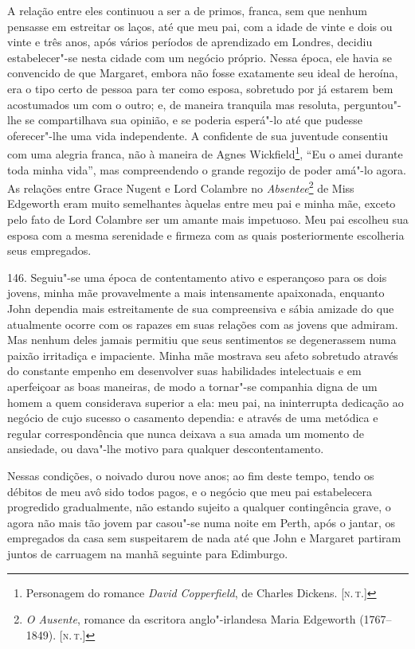 A relação entre eles continuou a ser a de primos, franca, sem que nenhum
pensasse em estreitar os laços, até que meu pai, com a idade de vinte e
dois ou vinte e três anos, após vários períodos de aprendizado em
Londres, decidiu estabelecer"-se nesta cidade com um negócio próprio.
Nessa época, ele havia se convencido de que Margaret, embora não fosse
exatamente seu ideal de heroína, era o tipo certo de pessoa para ter
como esposa, sobretudo por já estarem bem acostumados um com o outro; e,
de maneira tranquila mas resoluta, perguntou"-lhe se compartilhava sua
opinião, e se poderia esperá"-lo até que pudesse oferecer"-lhe uma vida
independente. A confidente de sua juventude consentiu com uma alegria
franca, não à maneira de Agnes Wickfield\footnote{Personagem do romance
  \emph{David Copperfield}, de Charles Dickens. {[}\textsc{n.\,t.}{]}}, ``Eu o
amei durante toda minha vida'', mas compreendendo o grande regozijo de
poder amá"-lo agora. As relações entre Grace Nugent e Lord Colambre no
\emph{Absentee}\footnote{\emph{O Ausente}, romance da escritora
  anglo"-irlandesa Maria Edgeworth (1767--1849). {[}\textsc{n.\,t.}{]}} de Miss
Edgeworth eram muito semelhantes àquelas entre meu pai e minha mãe,
exceto pelo fato de Lord Colambre ser um amante mais impetuoso. Meu pai
escolheu sua esposa com a mesma serenidade e firmeza com as quais
posteriormente escolheria seus empregados.

146. Seguiu"-se uma época de contentamento ativo e esperançoso para os
dois jovens, minha mãe provavelmente a mais intensamente apaixonada,
enquanto John dependia mais estreitamente de sua compreensiva e sábia
amizade do que atualmente ocorre com os rapazes em suas relações com as
jovens que admiram. Mas nenhum deles jamais permitiu que seus
sentimentos se degenerassem numa paixão irritadiça e impaciente. Minha
mãe mostrava seu afeto sobretudo através do constante empenho em
desenvolver suas habilidades intelectuais e em aperfeiçoar as boas
maneiras, de modo a tornar"-se companhia digna de um homem a quem
considerava superior a ela: meu pai, na ininterrupta dedicação ao
negócio de cujo sucesso o casamento dependia: e através de uma metódica
e regular correspondência que nunca deixava a sua amada um momento de
ansiedade, ou dava"-lhe motivo para qualquer descontentamento.

Nessas condições, o noivado durou nove anos; ao fim deste tempo, tendo
os débitos de meu avô sido todos pagos, e o negócio que meu pai
estabelecera progredido gradualmente, não estando sujeito a qualquer
contingência grave, o agora não mais tão jovem par casou"-se numa noite
em Perth, após o jantar, os empregados da casa sem suspeitarem de nada
até que John e Margaret partiram juntos de carruagem na manhã seguinte
para Edimburgo.

